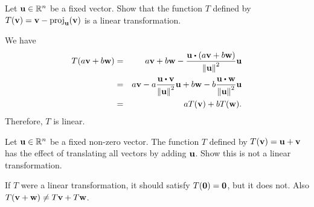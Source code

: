 \begin{ex}
  Let $\vect{u}\in\R^n$ be a fixed vector.  Show that the function $T$
  defined by
  $T(\vect{v}) = \vect{v}-\proj_{\vect{u}}(\vect{v})$ is a
  linear transformation.
  \begin{sol}
    We have
    \begin{eqnarray*}
      T(a\vect{v}+b\vect{w})
      &=& a\vect{v}+b\vect{w}
          - \frac{\vect{u}\dotprod(a\vect{v}+b\vect{w})}{\norm{\vect{u}}^2}\vect{u} \\
      &=& a\vect{v}
          - a\frac{\vect{u}\dotprod\vect{v}}{\norm{\vect{u}}^2}\vect{u}
          + b\vect{w}
          - b\frac{\vect{u}\dotprod\vect{w}}{\norm{\vect{u}}^2}\vect{u} \\
      &=& aT(\vect{v}) + bT(\vect{w}).
    \end{eqnarray*}
    Therefore, $T$ is linear.
  \end{sol}
\end{ex}

\begin{ex}
  Let $\vect{u}\in\R^n$ be a fixed non-zero vector. The function $T$
  defined by $T(\vect{v})=\vect{u}+\vect{v}$ has the effect of
  translating all vectors by adding $\vect{u}$. Show this is not a
  linear transformation.
  \begin{sol}
    If $T$ were a linear transformation, it should satisfy
    $T(\vect{0}) = \vect{0}$, but it does not. Also
    $T(\vect{v}+\vect{w}) \neq T\vect{v}+T\vect{w}$.
  \end{sol}
\end{ex}

